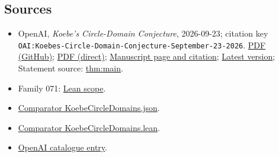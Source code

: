 \documentclass[11pt]{article}
\begin{document}
\subsection{Sources}
\begin{itemize}
\item OpenAI, \emph{Koebe's Circle-Domain Conjecture}, 2026-09-23; citation key \texttt{OAI:Koebes-Circle-Domain-Conjecture-September-23-2026}. \href{https://github.com/openai/math/blob/adc7f1241b42e322a6451854ab7e4b4c146bf78a/preprints/Koebes-Circle-Domain-Conjecture-September-23-2026/paper.pdf}{PDF (GitHub)}; \href{https://github.com/openai/math/raw/adc7f1241b42e322a6451854ab7e4b4c146bf78a/preprints/Koebes-Circle-Domain-Conjecture-September-23-2026/paper.pdf}{PDF (direct)}; \href{https://github.com/openai/math/blob/adc7f1241b42e322a6451854ab7e4b4c146bf78a/preprints/Koebes-Circle-Domain-Conjecture-September-23-2026/README.md}{Manuscript page and citation}; \href{https://github.com/openai/math/blob/main/preprints/Koebes-Circle-Domain-Conjecture-September-23-2026/paper.pdf}{Latest version}; Statement source: \href{https://github.com/openai/math/blob/adc7f1241b42e322a6451854ab7e4b4c146bf78a/preprints/Koebes-Circle-Domain-Conjecture-September-23-2026/build/sections/00-introduction.tex\#L9}{thm:main}.
\item Family 071: \href{https://github.com/openai/math/blob/adc7f1241b42e322a6451854ab7e4b4c146bf78a/lean/docs/071.md}{Lean scope}.
\item \href{https://github.com/openai/math/blob/adc7f1241b42e322a6451854ab7e4b4c146bf78a/lean/ComparatorChallenges/KoebeCircleDomains.json}{Comparator KoebeCircleDomains.json}.
\item \href{https://github.com/openai/math/blob/adc7f1241b42e322a6451854ab7e4b4c146bf78a/lean/ComparatorChallenges/KoebeCircleDomains.lean}{Comparator KoebeCircleDomains.lean}.
\item \href{https://github.com/openai/math/blob/adc7f1241b42e322a6451854ab7e4b4c146bf78a/CONTENTS.md}{OpenAI catalogue entry}.
\end{itemize}
\end{document}
